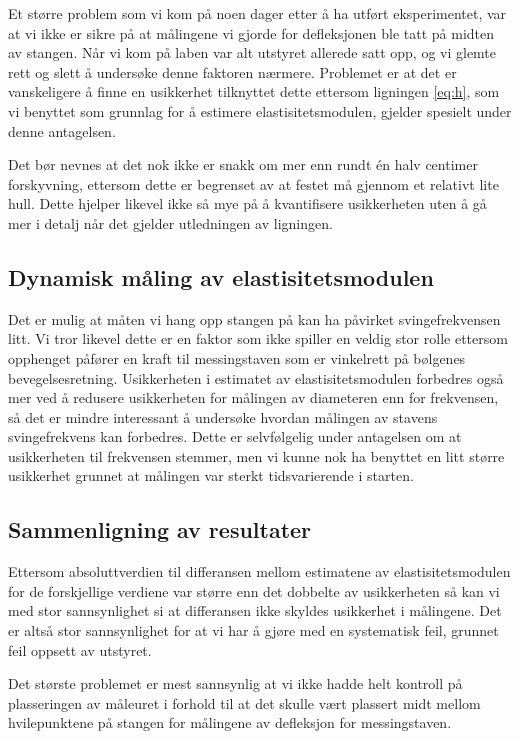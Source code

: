 \documentclass[a4paper,11pt, twocolumn]{article}
\begin{document}
Et større problem som vi kom på noen dager etter å ha utført eksperimentet, var at vi ikke er sikre på at målingene vi gjorde for defleksjonen ble tatt på midten av stangen. Når vi kom på laben var alt utstyret allerede satt opp, og vi glemte rett og slett å undersøke denne faktoren nærmere. Problemet er at det er vanskeligere å finne en usikkerhet tilknyttet dette ettersom ligningen \eqref{eq:h}, som vi benyttet som grunnlag for å estimere elastisitetsmodulen, gjelder spesielt under denne antagelsen. 

Det bør nevnes at det nok ikke er snakk om mer enn rundt \'en halv centimer forskyvning, ettersom dette er begrenset av at festet må gjennom et relativt lite hull. Dette hjelper likevel ikke så mye på å kvantifisere usikkerheten uten å gå mer i detalj når det gjelder utledningen av ligningen.

\subsection{Dynamisk måling av elastisitetsmodulen}
Det er mulig at måten vi hang opp stangen på kan ha påvirket svingefrekvensen litt. Vi tror likevel dette er en faktor som ikke spiller en veldig stor rolle ettersom opphenget påfører en kraft til messingstaven som er vinkelrett på bølgenes bevegelsesretning. Usikkerheten i estimatet av elastisitetsmodulen forbedres også mer ved å redusere usikkerheten for målingen av diameteren enn for frekvensen, så det er mindre interessant å undersøke hvordan målingen av stavens svingefrekvens kan forbedres. Dette er selvfølgelig under antagelsen om at usikkerheten til frekvensen stemmer, men vi kunne nok ha benyttet en litt større usikkerhet grunnet at målingen var sterkt tidsvarierende i starten.

\subsection{Sammenligning av resultater}
Ettersom absoluttverdien til differansen mellom estimatene av elastisitetsmodulen for de forskjellige verdiene var større enn det dobbelte av usikkerheten så kan vi med stor sannsynlighet si at differansen ikke skyldes usikkerhet i målingene. Det er altså stor sannsynlighet for at vi har å gjøre med en systematisk feil, grunnet feil oppsett av utstyret.

Det største problemet er mest sannsynlig at vi ikke hadde helt kontroll på plasseringen av måleuret i forhold til at det skulle vært plassert midt mellom hvilepunktene på stangen for målingene av defleksjon for messingstaven. 
\end{document}

